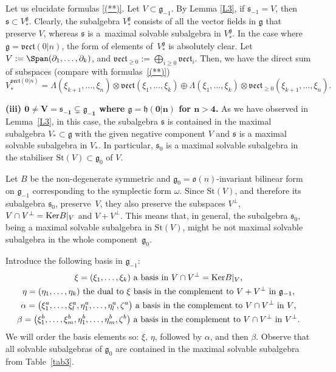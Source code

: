 \documentclass[pdftex]{sigma}
\newcommand {\fg} {{\mathfrak{g}}} %
\newcommand {\fh} {{\mathfrak{h}}}
\newcommand {\fo} {{\mathfrak{o}}}
\newcommand {\fs} {{\mathfrak{s}}}
\newcommand {\fvect} {{\mathfrak{vect}}} %
\newcommand {\<} [2] {{\left.\vphantom{#2}\right.^{#1\!}\!{#2}}}
\numberwithin{equation}{section}
\begin{document}
Let us elucidate formulas \eqref{(**)}. Let $V\subset \fg_{-1}$.
By Lemma \ref{L3}, if $\fs_{-1}=V$, then $\fs\subset V_*^\fg$.
Clearly, the subalgebra $V_*^\fg$ consists of all the vector fields in $\fg$ that preserve $V$, whereas $\fs$ is a~maximal solvable subalgebra in $V_*^\fg$. In the case where $\fg=\fvect(0|n)$, the form of elements of~$V_*^\fg$ is absolutely clear. Let ${V:=\Span(\partial_1, \dots, \partial_k)}$, and $\fvect_{\geq 0}:=\bigoplus_{i\ge 0} \fvect_i$. Then, we have the direct sum of subspaces (compare with formulas~\eqref{(**)})
\[
V_*^{\fvect(0|n)}= \Lambda(\xi_{k+1},\dots, \xi_n)\otimes \fvect(\xi_1,\dots, \xi_k)\oplus \Lambda(\xi_1,\dots,\xi_k)\otimes \fvect_{\geq 0}(\xi_{k+1},\dots, \xi_n).
\]

{\bf (iii) $\boldsymbol{0\neq V=\fs_{-1}\subsetneq\fg_{-1}}$ where $\boldsymbol{\fg=\fh(0|n)}$ for $\boldsymbol{n>4}$.} As we have observed in Lem\-ma~\ref{L3}, in this case, the subalgebra $\fs$ is contained in the maximal subalgebra $V_*\subset \fg$ with the given negative component $V$ and $\fs$ is a maximal solvable subalgebra in $V_*$. In particular, $\fs_0$ is a maximal solvable subalgebra in the stabiliser $\text{St}(V)\subset \fg_0$ of $V$.

Let $B$ be the non-degenerate symmetric and $\fg_0=\fo(n)$-invariant bilinear form on $\fg_{-1}$ corresponding to the symplectic form $\omega$. Since $\text{St}(V)$, and therefore its subalgebra $\fs_0$, preserve~$V$, they also preserve the subspaces $V^\perp$, $V\cap V^\perp= {\rm{Ker}} B|_V$ and $V+V^\perp$. This means that, in general, the subalgebra $\fs_0$, being a maximal solvable subalgebra in $\text{St}(V)$, might be not maximal solvable subalgebra in the whole component~$\fg_0$.

Introduce the following basis in $\fg_{-1}$:
\begin{gather}
\text{$\xi=(\xi_1, \dots , \xi_k)$ a basis in $V\cap V^\perp={\rm{Ker}} B|_V$,}\nonumber\\
\text{$\eta=(\eta_1, \dots, \eta_k)$ the dual to $\xi$ basis in the complement to $V+V^\perp$ in $\fg_{-1}$,}\nonumber\\
\text{$\alpha=\bigl(\xi_1^a, \dots, \xi_l^a, \eta^a_1,\dots, \eta_l^a, \zeta^a\bigr)$ a basis in the complement to $V\cap V^\perp$ in $V$,}\nonumber\\
\text{$\beta=\bigl(\xi_1^b, \dots, \xi_m^b, \eta^b_1,\dots, \eta_m^b, \zeta^b\bigr)$ a basis in the complement to $V\cap V^\perp$ in $V^\perp$.}\label{klm}
\end{gather}
We will order the basis elements so: $\xi$, $\eta$, followed by $\alpha$, and then $\beta$. Observe that all solvable subalgebras of $\fg_0$ are contained in the maximal solvable subalgebra from Table~\ref{tab3}.
\end{document}
